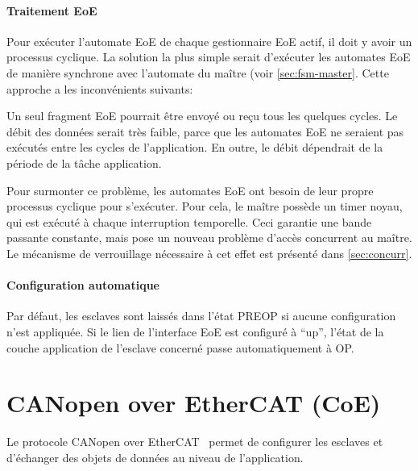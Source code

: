 \documentclass[a4paper,12pt,BCOR=6mm,bibtotoc,idxtotoc]{scrbook}
\begin{document}
\paragraph{Traitement EoE}

Pour ex\'ecuter l'automate EoE de chaque gestionnaire EoE actif, il
doit y avoir un processus cyclique.  La solution la plus simple serait
d'ex\'ecuter les automates EoE de mani\`ere synchrone avec l'automate
du ma\^itre (voir \autoref{sec:fsm-master}.  Cette approche a les
inconv\'enients suivants:

Un seul fragment EoE pourrait \^etre envoy\'e ou re\c{c}u tous les
quelques cycles.  Le d\'ebit des donn\'ees serait tr\`es faible, parce
que les automates EoE ne seraient pas ex\'ecut\'es entre les cycles de
l'application.  En outre, le d\'ebit d\'ependrait de la p\'eriode de
la t\^ache application.

Pour surmonter ce probl\`eme, les automates EoE ont besoin de leur
propre processus cyclique pour s'ex\'ecuter.  Pour cela, le ma\^itre
poss\`ede un timer noyau, qui est ex\'ecut\'e \`a chaque interruption
temporelle.  Ceci garantie une bande passante constante, mais pose un
nouveau probl\`eme d'acc\`es concurrent au ma\^itre.  Le m\'ecanisme
de verrouillage n\'ecessaire \`a cet effet est pr\'esent\'e dans
\autoref{sec:concurr}.

\paragraph{Configuration automatique}

Par d\'efaut, les esclaves sont laiss\'es dans l'\'etat PREOP si
aucune configuration n'est appliqu\'ee.  Si le lien de l'interface EoE
est configur\'e \`a ``up'', l'\'etat de la couche application de
l'esclave concern\'e passe automatiquement \`a OP.


\section{CANopen over EtherCAT (CoE)}
\label{sec:coe}

Le protocole CANopen over EtherCAT~\cite[sec.~5.6]{alspec} permet de
configurer les esclaves et d'\'echanger des objets de donn\'ees au
niveau de l'application.

%
%
\end{document}
